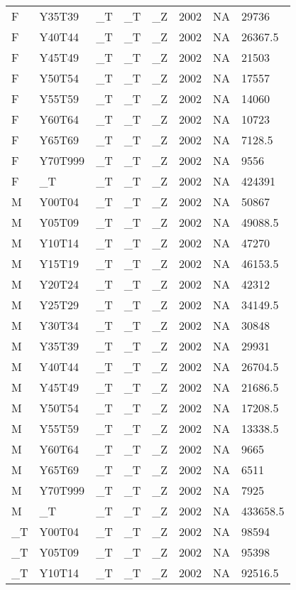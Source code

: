 \begin{longtable}[t]{llllllll}
F & Y35T39 & \_T & \_T & \_Z & 2002 & NA & 29736\\
F & Y40T44 & \_T & \_T & \_Z & 2002 & NA & 26367.5\\
F & Y45T49 & \_T & \_T & \_Z & 2002 & NA & 21503\\
F & Y50T54 & \_T & \_T & \_Z & 2002 & NA & 17557\\
\addlinespace
F & Y55T59 & \_T & \_T & \_Z & 2002 & NA & 14060\\
F & Y60T64 & \_T & \_T & \_Z & 2002 & NA & 10723\\
F & Y65T69 & \_T & \_T & \_Z & 2002 & NA & 7128.5\\
F & Y70T999 & \_T & \_T & \_Z & 2002 & NA & 9556\\
F & \_T & \_T & \_T & \_Z & 2002 & NA & 424391\\
\addlinespace
M & Y00T04 & \_T & \_T & \_Z & 2002 & NA & 50867\\
M & Y05T09 & \_T & \_T & \_Z & 2002 & NA & 49088.5\\
M & Y10T14 & \_T & \_T & \_Z & 2002 & NA & 47270\\
M & Y15T19 & \_T & \_T & \_Z & 2002 & NA & 46153.5\\
M & Y20T24 & \_T & \_T & \_Z & 2002 & NA & 42312\\
\addlinespace
M & Y25T29 & \_T & \_T & \_Z & 2002 & NA & 34149.5\\
M & Y30T34 & \_T & \_T & \_Z & 2002 & NA & 30848\\
M & Y35T39 & \_T & \_T & \_Z & 2002 & NA & 29931\\
M & Y40T44 & \_T & \_T & \_Z & 2002 & NA & 26704.5\\
M & Y45T49 & \_T & \_T & \_Z & 2002 & NA & 21686.5\\
\addlinespace
M & Y50T54 & \_T & \_T & \_Z & 2002 & NA & 17208.5\\
M & Y55T59 & \_T & \_T & \_Z & 2002 & NA & 13338.5\\
M & Y60T64 & \_T & \_T & \_Z & 2002 & NA & 9665\\
M & Y65T69 & \_T & \_T & \_Z & 2002 & NA & 6511\\
M & Y70T999 & \_T & \_T & \_Z & 2002 & NA & 7925\\
\addlinespace
M & \_T & \_T & \_T & \_Z & 2002 & NA & 433658.5\\
\_T & Y00T04 & \_T & \_T & \_Z & 2002 & NA & 98594\\
\_T & Y05T09 & \_T & \_T & \_Z & 2002 & NA & 95398\\
\_T & Y10T14 & \_T & \_T & \_Z & 2002 & NA & 92516.5\\

\end{longtable}

